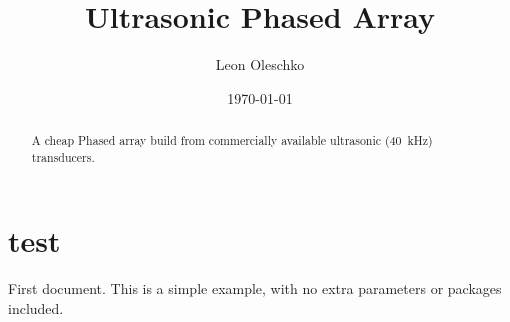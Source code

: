 \documentclass[ngerman, a4paper]{scrartcl}
\title{Ultrasonic Phased Array}
\author{Leon Oleschko}
\begin{document}
\date{\today}
\maketitle

\begin{abstract}
A cheap Phased array build from commercially available ultrasonic (\SI{40}{\kHz}) transducers.
\end{abstract}

\section*{test}
First document. This is a simple example, with no 
extra parameters or packages included.
\end{document}
